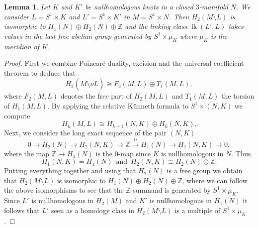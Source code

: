 \documentclass{amsart} %
\DeclareMathOperator{\lk}{lk}
\newcommand{\Z}{\mathbb{Z}}
\theoremstyle{thm}
\newtheorem{lem}[Theorem]{Lemma}
\theoremstyle{definition}
\begin{document}


\begin{lem} \label{lem:hom2}
Let $K$ and $K'$ be nullhomologous knots in a closed $3$-manifold $N$. We consider $L=S^1\times K$ and $L'=S^1\times K'$ in $M=S^1\times N$. Then $H_2(M\setminus L)$ is isomorphic to $H_1(N)\oplus H_2(N)\oplus \Z$ and the linking class $\lk(L',L)$ takes values in the last free abelian group generated by $S^1\times \mu_K$ where $\mu_K$ is the meridian of $K$.
\end{lem}

\begin{proof}
First we combine Poincar\'e duality, excision and the universal coefficient theorem to deduce that
\begin{equation*}
H_2(M\setminus \mathring{\nu L})\cong F_2(M,L)\oplus T_1(M,L),
\end{equation*}
where $F_2(M,L)$ denotes the free part of $H_2(M,L)$ and $T_1(M,L)$ the torsion of $H_1(M,L)$. By applying the relative K\"unneth formula to $S^1\times (N,K)$ we compute
\begin{equation*}
H_k(M,L)\cong H_{k-1}(N,K)\oplus H_k(N,K).
\end{equation*}
Next, we consider the long exact sequence of the pair $(N,K)$
\begin{equation*}
0\longrightarrow H_2(N)\longrightarrow H_2(N,K)\longrightarrow \Z\overset{0}{\longrightarrow} H_1(N)\longrightarrow H_1(N,K)\longrightarrow 0,
\end{equation*}
where the map $\Z\rightarrow H_1(N)$ is the $0$-map since $K$ is nullhomologous in $N$. Thus 
\begin{equation*}
H_1(N,K)=H_1(N)\,\text{ and }\, H_2(N,K)\cong H_2(N)\oplus\Z.
\end{equation*}
Putting everything together and using that $H_2(N)$ is a free group we obtain that $H_2(M\setminus L)$ is isomorphic to $H_1(N)\oplus H_2(N)\oplus \Z$, where we can follow the above isomorphisms to see that the $\Z$-summand is generated by $S^1\times \mu_K$.
Since $L'$ is nullhomologous in $H_2(M)$ and $K'$ is nullhomologous in $H_1(N)$ it follows that $L'$ seen as a homology class in $H_2(M\setminus L)$ is a multiple of $S^1\times \mu_K$.
\end{proof}
\end{document}
